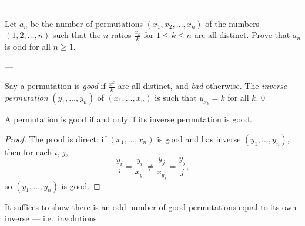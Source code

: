 
---

Let $a_n$ be the number of permutations $(x_1,x_2,\ldots,x_n)$ of the numbers $(1,2,\ldots,n)$ such that the $n$ ratios $\frac{x_k}k$ for $1\le k\le n$ are all distinct. Prove that $a_n$ is odd for all $n\ge1$.

---

Say a permutation is \emph{good} if $\tfrac{x^k}k$ are all distinct, and \emph{bad} otherwise. The \emph{inverse permutation} $(y_1,\ldots,y_n)$ of $(x_1,\ldots,x_n)$ is such that $y_{x_k}=k$ for all $k$.
\setcounter{lemma}0
\begin{lemma}
    A permutation is good if and only if its inverse permutation is good.
\end{lemma}
\begin{proof}
    The proof is direct: if $(x_1,\ldots,x_n)$ is good and has inverse $(y_1,\ldots,y_n)$, then for each $i$, $j$, \[\frac{y_i}i=\frac{y_i}{x_{y_i}}\ne\frac{y_j}{x_{y_j}}=\frac{y_j}j,\]
    so $(y_1,\ldots,y_n)$ is good.
\end{proof}

It suffices to show there is an odd number of good permutations equal to its own inverse --- i.e.\ involutions.

